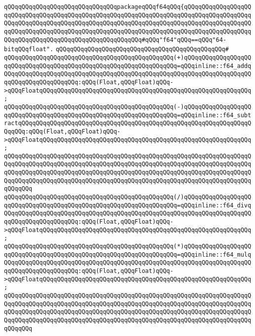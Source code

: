 \verb|qQQqqQQqqQQqqQQqqQQqqQQqqQQqqQQqpackageqQQqf64qQQq{qQQqqQQqqQQqqQQqqQQqqQQqqQQqqQQqqQQqqQQqqQQqqQQqqQQqqQQqqQQqqQQqqQQqqQQqqQQqqQQqqQQqqQQqqQQqqQQqqQQqqQQqqQQqqQQqqQQqqQQqqQQqqQQqqQQqqQQqqQQqqQQqqQQqqQQqqQQqqQQqqQQqqQQqqQQqqQQqqQQqqQQqqQQqqQQqqQQqqQQqqQQqqQQqqQQqqQQqqQQqqQQqqQQqqQQqqQQqqQQqqQQqqQQqqQQqqQQqqQQqqQQqqQQq#qQQq"f64"qQQq==qQQq"64-bitqQQqfloat".|\newline
\verb|qQQqqQQqqQQqqQQqqQQqqQQqqQQqqQQqqQQqqQQqqQQqqQQq#|\newline
\verb|qQQqqQQqqQQqqQQqqQQqqQQqqQQqqQQqqQQqqQQqqQQqqQQq(+)qQQqqQQqqQQqqQQqqQQqqQQqqQQqqQQqqQQqqQQqqQQqqQQqqQQqqQQqqQQqqQQqqQQq=qQQqinline::f64_addqQQqqQQqqQQqqQQqqQQqqQQqqQQqqQQqqQQqqQQqqQQqqQQqqQQqqQQqqQQqqQQqqQQqqQQqqQQqqQQqqQQqqQQqqQQq:qQQq(Float,qQQqFloat)qQQq->qQQqFloatqQQqqQQqqQQqqQQqqQQqqQQqqQQqqQQqqQQqqQQqqQQqqQQqqQQqqQQqqQQq;|\newline
\verb|qQQqqQQqqQQqqQQqqQQqqQQqqQQqqQQqqQQqqQQqqQQqqQQq(-)qQQqqQQqqQQqqQQqqQQqqQQqqQQqqQQqqQQqqQQqqQQqqQQqqQQqqQQqqQQqqQQqqQQq=qQQqinline::f64_subtractqQQqqQQqqQQqqQQqqQQqqQQqqQQqqQQqqQQqqQQqqQQqqQQqqQQqqQQqqQQqqQQqqQQqqQQq:qQQq(Float,qQQqFloat)qQQq->qQQqFloatqQQqqQQqqQQqqQQqqQQqqQQqqQQqqQQqqQQqqQQqqQQqqQQqqQQqqQQqqQQq;|\newline
\verb|qQQqqQQqqQQqqQQqqQQqqQQqqQQqqQQqqQQqqQQqqQQqqQQqqQQqqQQqqQQqqQQqqQQqqQQqqQQqqQQqqQQqqQQqqQQqqQQqqQQqqQQqqQQqqQQqqQQqqQQqqQQqqQQqqQQqqQQqqQQqqQQqqQQqqQQqqQQqqQQqqQQqqQQqqQQqqQQqqQQqqQQqqQQqqQQqqQQqqQQqqQQqqQQqqQQqqQQqqQQqqQQqqQQqqQQqqQQqqQQqqQQqqQQqqQQqqQQqqQQqqQQqqQQqqQQqqQQqqQQqqQQqqQQq|\newline
\verb|qQQqqQQqqQQqqQQqqQQqqQQqqQQqqQQqqQQqqQQqqQQqqQQq(/)qQQqqQQqqQQqqQQqqQQqqQQqqQQqqQQqqQQqqQQqqQQqqQQqqQQqqQQqqQQqqQQqqQQq=qQQqinline::f64_divqQQqqQQqqQQqqQQqqQQqqQQqqQQqqQQqqQQqqQQqqQQqqQQqqQQqqQQqqQQqqQQqqQQqqQQqqQQqqQQqqQQqqQQqqQQq:qQQq(Float,qQQqFloat)qQQq->qQQqFloatqQQqqQQqqQQqqQQqqQQqqQQqqQQqqQQqqQQqqQQqqQQqqQQqqQQqqQQqqQQq;|\newline
\verb|qQQqqQQqqQQqqQQqqQQqqQQqqQQqqQQqqQQqqQQqqQQqqQQq(*)qQQqqQQqqQQqqQQqqQQqqQQqqQQqqQQqqQQqqQQqqQQqqQQqqQQqqQQqqQQqqQQqqQQq=qQQqinline::f64_mulqQQqqQQqqQQqqQQqqQQqqQQqqQQqqQQqqQQqqQQqqQQqqQQqqQQqqQQqqQQqqQQqqQQqqQQqqQQqqQQqqQQqqQQqqQQq:qQQq(Float,qQQqFloat)qQQq->qQQqFloatqQQqqQQqqQQqqQQqqQQqqQQqqQQqqQQqqQQqqQQqqQQqqQQqqQQqqQQqqQQq;|\newline
\verb|qQQqqQQqqQQqqQQqqQQqqQQqqQQqqQQqqQQqqQQqqQQqqQQqqQQqqQQqqQQqqQQqqQQqqQQqqQQqqQQqqQQqqQQqqQQqqQQqqQQqqQQqqQQqqQQqqQQqqQQqqQQqqQQqqQQqqQQqqQQqqQQqqQQqqQQqqQQqqQQqqQQqqQQqqQQqqQQqqQQqqQQqqQQqqQQqqQQqqQQqqQQqqQQqqQQqqQQqqQQqqQQqqQQqqQQqqQQqqQQqqQQqqQQqqQQqqQQqqQQqqQQqqQQqqQQqqQQqqQQqqQQqqQQq|\newline
